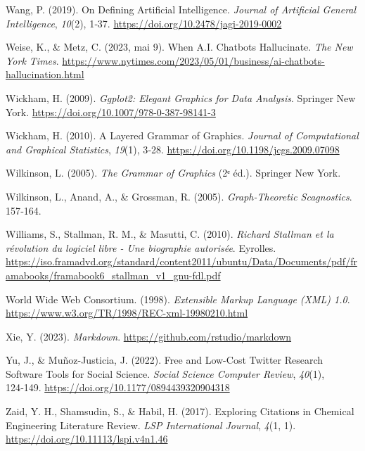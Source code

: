 \documentclass[
  letterpaper,
  DIV=11,
  numbers=noendperiod,
  oneside]{scrreprt}
\newlength{\cslhangindent}
\newlength{\cslentryspacingunit} %
\newenvironment{CSLReferences}[2] %
 {%
  \setlength{\parindent}{0pt}
  \ifodd #1
  \let\oldpar\par
  \def\par{\hangindent=\cslhangindent\oldpar}
  \fi
  \setlength{\parskip}{#2\cslentryspacingunit}
 }%
 {}
\begin{document}
\begin{CSLReferences}{1}{0}
\leavevmode{}%
Wang, P. (2019). On {Defining Artificial Intelligence}. \emph{Journal of
Artificial General Intelligence}, \emph{10}(2), 1‑37.
\url{https://doi.org/10.2478/jagi-2019-0002}

\leavevmode{}%
Weise, K., \& Metz, C. (2023, mai 9). When {A}.{I}. {Chatbots
Hallucinate}. \emph{The New York Times}.
\url{https://www.nytimes.com/2023/05/01/business/ai-chatbots-hallucination.html}

\leavevmode{}%
Wickham, H. (2009). \emph{Ggplot2: {Elegant Graphics} for {Data
Analysis}}. Springer New York.
\url{https://doi.org/10.1007/978-0-387-98141-3}

\leavevmode{}%
Wickham, H. (2010). A {Layered Grammar} of {Graphics}. \emph{Journal of
Computational and Graphical Statistics}, \emph{19}(1), 3‑28.
\url{https://doi.org/10.1198/jcgs.2009.07098}

\leavevmode{}%
Wilkinson, L. (2005). \emph{The {Grammar} of {Graphics}} (2ᵉ éd.).
Springer New York.

\leavevmode{}%
Wilkinson, L., Anand, A., \& Grossman, R. (2005). \emph{Graph-{Theoretic
Scagnostics}}. 157‑164.

\leavevmode{}%
Williams, S., Stallman, R. M., \& Masutti, C. (2010). \emph{Richard
Stallman et la révolution du logiciel libre - Une biographie autorisée}.
Eyrolles.
\url{https://iso.framadvd.org/standard/content2011/ubuntu/Data/Documents/pdf/framabooks/framabook6_stallman_v1_gnu-fdl.pdf}

\leavevmode{}%
World Wide Web Consortium. (1998). \emph{Extensible {Markup Language}
({XML}) 1.0}. \url{https://www.w3.org/TR/1998/REC-xml-19980210.html}

\leavevmode{}%
Xie, Y. (2023). \emph{Markdown}.
\url{https://github.com/rstudio/markdown}

\leavevmode{}%
Yu, J., \& Muñoz-Justicia, J. (2022). Free and {Low-Cost Twitter
Research Software Tools} for {Social Science}. \emph{Social Science
Computer Review}, \emph{40}(1), 124‑149.
\url{https://doi.org/10.1177/0894439320904318}

\leavevmode{}%
Zaid, Y. H., Shamsudin, S., \& Habil, H. (2017). Exploring {Citations}
in {Chemical Engineering Literature Review}. \emph{LSP International
Journal}, \emph{4}(1, 1). \url{https://doi.org/10.11113/lspi.v4n1.46}

\end{CSLReferences}
\end{document}
